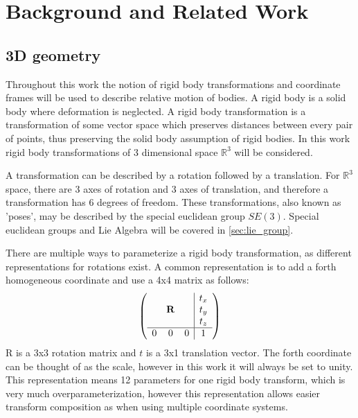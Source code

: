 
\chapter{Background and Related Work}
\label{chapter:Related_Work}


\section{3D geometry}

Throughout this work the notion of rigid body transformations and coordinate frames will be used to describe relative motion of bodies.  A rigid body is a solid body where deformation is neglected.  A rigid body transformation is a transformation of some vector space which preserves distances between every pair of points, thus preserving the solid body assumption of rigid bodies. In this work rigid body transformations of 3 dimensional space $\mathbb{R}^3$ will be considered.

A transformation can be described by a rotation followed by a translation.  For $\mathbb{R}^3$ space, there are 3 axes of rotation and 3 axes of translation, and therefore a transformation has 6 degrees of freedom.  These transformations, also known as  'poses', may be described by the special euclidean group $SE(3)$.  Special euclidean groups and Lie Algebra will be covered in \ref{sec:lie_group}.

There are multiple ways to parameterize a rigid body transformation, as different representations for rotations exist.  A common representation is to add a forth homogeneous coordinate and use a 4x4 matrix as follows:
\begin{align}
    \left( 
             \begin{array}{ccc|c}
               &        &   & t_x \\
               & \mathbf{R} &   & t_y \\
               &        &   & t_z \\ \hline
             0 & 0      & 0 & 1 \end{array} \right) 
\end{align}
R is a 3x3 rotation matrix and $t$ is a 3x1 translation vector.  The forth coordinate can be thought of as the scale, however in this work it will always be set to unity.  This representation means 12 parameters for one rigid body transform, which is very much overparameterization, however this representation allows easier transform composition as when using multiple coordinate systems.

